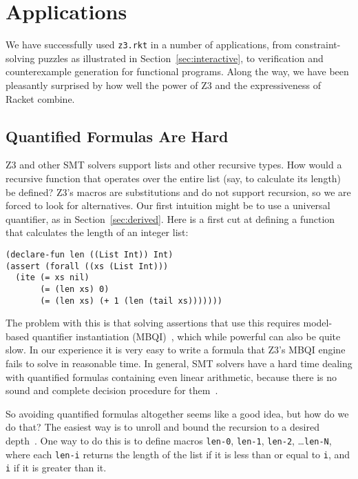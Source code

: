 \section{Applications}

We have successfully used \texttt{z3.rkt} in a number of applications, from
constraint-solving puzzles as illustrated in Section~\ref{sec:interactive}, to
verification and counterexample generation for functional programs. Along the
way, we have been pleasantly surprised by how well the power of Z3 and the
expressiveness of Racket combine.

\subsection{Quantified Formulas Are Hard}

Z3 and other SMT solvers support lists and other recursive types. How would a
recursive function that operates over the entire list (say, to calculate its
length) be defined? Z3's macros are substitutions and do not support
recursion, so we are forced to look for alternatives. Our first intuition
might be to use a universal quantifier, as in Section~\ref{sec:derived}. Here
is a first cut at defining a function that calculates the length of an integer
list:

\begin{verbatim}
(declare-fun len ((List Int)) Int)
(assert (forall ((xs (List Int)))
  (ite (= xs nil)
       (= (len xs) 0)
       (= (len xs) (+ 1 (len (tail xs)))))))
\end{verbatim}

The problem with this is that solving assertions that use this requires model-
based quantifier instantiation (MBQI)~\cite{mbqi}, which while powerful can
also be quite slow. In our experience it is very easy to write a formula that
Z3's MBQI engine fails to solve in reasonable time. In general, SMT solvers
have a hard time dealing with quantified formulas containing even linear
arithmetic, because there is no sound and complete decision procedure for
them~\cite{halpern91}.

So avoiding quantified formulas altogether seems like a good idea, but how do
we do that? The easiest way is to unroll and bound the recursion to a desired
depth~\cite{sat-recursive}. One way to do this is to define macros
\texttt{len-0}, \texttt{len-1}, \texttt{len-2}, \ldots \texttt{len-N}, where
each \texttt{len-i} returns the length of the list if it is less than or equal
to \texttt{i}, and \texttt{i} if it is greater than it.

